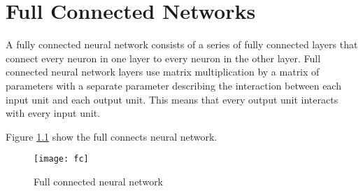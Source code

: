 
\chapter{Full Connected Networks}
\label{cha:full-conn-netw}

A fully connected neural network consists of a series of fully connected layers that connect every neuron in one layer to every neuron in the other layer.
Full connected neural network layers use matrix multiplication by a matrix of parameters with a separate parameter describing the interaction between each input unit and each output unit.
This means that every output unit interacts with every input unit.


Figure \ref{fig:fc} show the full connects neural network.
\begin{figure}[!htbp]
  \centering
  \texttt{[image: fc]}
  \caption{Full connected neural network}
  \label{fig:fc}
\end{figure}



